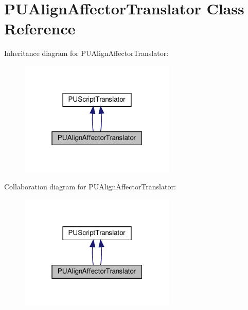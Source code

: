 \hypertarget{classPUAlignAffectorTranslator}{}\section{P\+U\+Align\+Affector\+Translator Class Reference}
\label{classPUAlignAffectorTranslator}


Inheritance diagram for P\+U\+Align\+Affector\+Translator\+:
\nopagebreak
\begin{figure}[H]
\begin{center}
\leavevmode
\includegraphics[width=211pt]{classPUAlignAffectorTranslator__inherit__graph}
\end{center}
\end{figure}


Collaboration diagram for P\+U\+Align\+Affector\+Translator\+:
\nopagebreak
\begin{figure}[H]
\begin{center}
\leavevmode
\includegraphics[width=211pt]{classPUAlignAffectorTranslator__coll__graph}
\end{center}
\end{figure}
